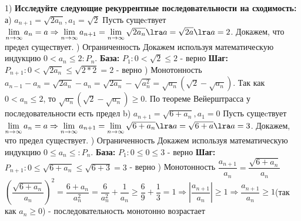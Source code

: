 \documentclass[11pt]{article}
\begin{document}
	1) \textbf{Исследуйте следующие рекуррентные последовательности на сходимость:} \bs
	а) $a_{n + 1} = \sqrt{2a_n}, a_1 = \sqrt{2}$ \bs
	Пусть сущеcтвует $\lim\limits_{n\to \infty} a_n = a \Rightarrow \lim\limits_{n\to \infty} a_{n + 1} = \lim\limits_{n\to \infty} \sqrt{2a_n} \lra a = \sqrt{2a} \lra a = 2$. \bs
	Докажем, что предел существует. ) Ограниченность \sspace
	Докажем используя математическую индукцию $0 < a_n \leq 2: P_n$. \sspace
	\textbf{База:} $P_1: 0 < \sqrt{2} \leq 2$ - верно \sspace
	\textbf{Шаг:} $P_{n + 1}: 0 < \sqrt{2a_n} \leq \sqrt{2*2} = 2$ - верно ) Монотонность \sspace
	$a_{n - 1} - a_n = \sqrt{2a_n} - a_n = \sqrt{2a_n} - \sqrt{a_n^2} = \sqrt{a_n}(\sqrt{2} - \sqrt{a_n})$. Так как $0 < a_n \leq 2$, то $\sqrt{a_n}(\sqrt{2} - \sqrt{a_n}) \geq 0$. \sspace
	По теореме Вейерштрасса у последовательности есть предел \bs
	\bs 
	b) $a_{n + 1} = \sqrt{6 + a_n}, a_1 = 0$ \bs
	Пусть сущеcтвует $\lim\limits_{n\to \infty} a_n = a \Rightarrow \lim\limits_{n\to \infty} a_{n + 1} = \lim\limits_{n\to \infty} \sqrt{6 + a_n} \lra a = \sqrt{6 + a} \lra a = 3$. \bs
	Докажем, что предел существует. ) Ограниченность \sspace
	Докажем используя математическую индукцию $0 \leq a_n \leq : P_n$. \sspace
	\textbf{База:} $P_1: 0 \leq 0 \leq 3$ - верно \sspace
	\textbf{Шаг:} $P_{n + 1}: 0 \leq \sqrt{6 + a_n} \leq \sqrt{6 + 3} = 3$ - верно ) Монотонность \sspace
	$\dfrac{a_{n + 1}}{a_n} = \dfrac{\sqrt{6 + a_n}}{a_n}$ \sspace
	$(\dfrac{\sqrt{6 + a_n}}{a_n})^2 = \dfrac{6 + a_n}{a_n^2} = \dfrac{6}{a_n^2} + \dfrac{1}{a_n} \geq \dfrac{6}{9} + \dfrac{1}{3} = 1 \Rightarrow |\dfrac{a_{n + 1}}{a_n}| \geq 1 \Rightarrow \dfrac{a_{n + 1}}{a_n} \geq 1 $(так как $a_{n} \geq 0$) \sspace - последовательность монотонно возрастает \sspace
	
\end{document}
